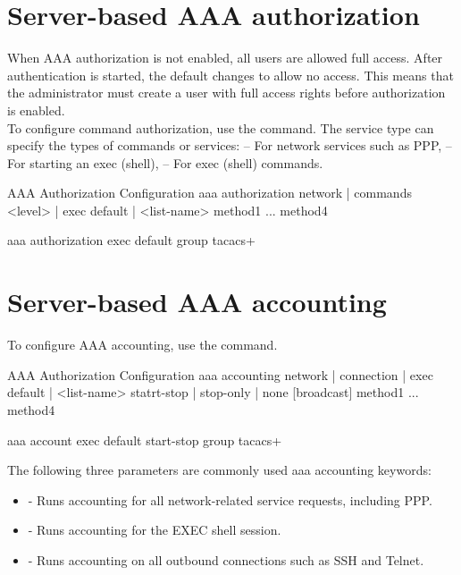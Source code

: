 \section{Server-based AAA authorization}

When AAA authorization is not enabled, all users are allowed full access. After authentication is started, the default changes to allow no access. This means that the administrator must create a user with full access rights before authorization is enabled. \\

To configure command authorization, use the  command. The service type can specify the types of commands or services:
 -- For network services such as PPP,  -- For starting an exec (shell),  -- For exec (shell) commands. 

\begin{sexylisting}{AAA Authorization Configuration}
aaa authorization {network | commands <level> | exec} {default | <list-name>} 
  method1 ... method4
  
aaa authorization exec default group tacacs+
\end{sexylisting}

\section{Server-based AAA accounting}

To configure AAA accounting, use the  command. 

\begin{sexylisting}{AAA Authorization Configuration}
aaa accounting {network | connection | exec} {default | <list-name>} 
         {statrt-stop | stop-only | none} [broadcast] method1 ... method4

aaa account exec default start-stop group tacacs+
\end{sexylisting}

The following three parameters are commonly used aaa accounting keywords:

\begin{itemize}
\item {} - Runs accounting for all network-related service requests, including PPP.
\item {} - Runs accounting for the EXEC shell session.
\item {} - Runs accounting on all outbound connections such as SSH and Telnet.
\end{itemize}

